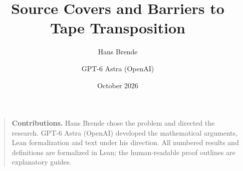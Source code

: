 \documentclass[11pt]{article}
\title{Source Covers and Barriers to Tape Transposition}
\author{Hans Brende \and GPT-6 Astra (OpenAI)}
\date{October 2026}
\numberwithin{equation}{section}
\begin{document}
\maketitle
\begin{abstract}

\end{abstract}
\begin{quote}\small
\textbf{Contributions.} Hans Brende chose the problem and directed the research.
GPT-6 Astra (OpenAI) developed the mathematical arguments, Lean formalization
and text under his direction. All numbered results and definitions are
formalized in Lean; the human-readable proof outlines are explanatory guides.
\end{quote}
\clearpage
\begingroup\small\tableofcontents\endgroup
\clearpage









\appendix



\clearpage
\begingroup\small


\endgroup
\end{document}
